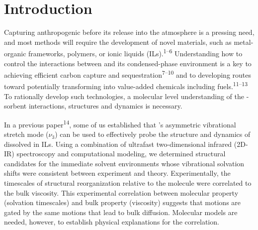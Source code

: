 \section{Introduction}
\label{paper_02:sec:I}

Capturing anthropogenic  before its release into the atmosphere is a pressing need, and most methods will require the development of novel materials, such as metal-organic frameworks, polymers, or ionic liquids (ILs).\textsuperscript{1--6} Understanding how to control the interactions between  and its condensed-phase environment is a key to achieving efficient carbon capture and sequestration\textsuperscript{7--10} and to developing routes toward potentially transforming  into value-added chemicals including fuels.\textsuperscript{11--13} To rationally develop such technologies, a molecular level understanding of the -sorbent interactions, structures and dynamics is necessary.

In a previous paper\textsuperscript{14}, some of us established that 's asymmetric vibrational stretch mode (\(\nu_{3}\)) can be used to effectively probe the structure and dynamics of  dissolved in ILs. Using a combination of ultrafast two-dimensional infrared (2D-IR) spectroscopy and computational modeling, we determined structural candidates for the immediate  solvent environments whose vibrational solvation shifts were consistent between experiment and theory. Experimentally, the timescales of structural reorganization relative to the  molecule were correlated to the bulk viscosity. This experimental correlation between molecular property (solvation timescales) and bulk property (viscosity) suggests that  motions are gated by the same motions that lead to bulk diffusion. Molecular models are needed, however, to establish physical explanations for the correlation.

